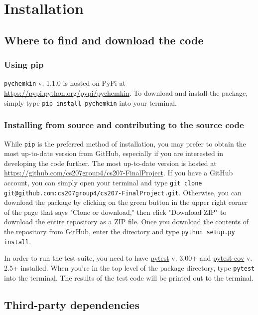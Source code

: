 \documentclass[12pt]{article}
\begin{document}
\section{Installation}

\subsection{Where to find and download the code}
\subsubsection{Using pip}
\texttt{pychemkin} v. 1.1.0 is hosted on PyPi at \url{https://pypi.python.org/pypi/pychemkin}. To download and install the package, simply type 
\texttt{pip install pychemkin} into your terminal.
\subsubsection{Installing from source and contributing to the source code}
While \texttt{pip} is the preferred method of installation, you may prefer to obtain the most up-to-date version from GitHub, especially if you are interested in developing the code further. The most up-to-date version is hosted at \url{https://github.com/cs207group4/cs207-FinalProject}. If you have a GitHub account, you can simply open your terminal and type {\tt git clone git@github.com:cs207group4/cs207-FinalProject.git}. Otherwise, you can download the package by clicking on the green button in the upper right corner of the page that says "Clone or download," then click "Download ZIP" to download the entire repository as a ZIP file. Once you download the contents of the repository from GitHub, enter the directory and type {\tt python setup.py install}.

In order to run the test suite, you need to have \href{https://docs.pytest.org/en/latest/}{pytest} v. 3.00+ and \href{https://pypi.python.org/pypi/pytest-cov}{pytest-cov} v. 2.5+ installed. When you're in the top level of the package directory, type {\tt pytest} into the terminal. The results of the test code will be printed out to the terminal.
 \newline

\subsection{Third-party dependencies}
\end{document}
